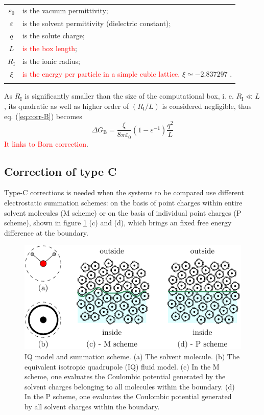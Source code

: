 \begin{tabular}{cl}
 $\varepsilon_{0}$ & is the vacuum permittivity;\tabularnewline
$\varepsilon$ & is the solvent permittivity (dielectric constant);\tabularnewline
$q$ & is the solute charge;\tabularnewline
$L$ & \textcolor{red}{is the box length};\tabularnewline
$R_{\mathrm{I}}$ & is the ionic radius;\tabularnewline
$\xi$ & \textcolor{red}{is the energy per particle in a simple cubic lattice,}
$\xi\simeq-2.837297$ \citep{nijboer}.\tabularnewline
 & \tabularnewline
\end{tabular} 

As $R_{\mathrm{I}}$ is significantly smaller than the size of the
computational box, i. e. $R_{\mathrm{I}}\ll L$, its quadratic as
well as higher order of $\left(R_{\mathrm{I}}/L\right)$ is considered
negligible, thus eq. (\ref{eq:corr-B}) becomes
\begin{equation}
\Delta G_{\mathrm{B}}=\frac{\xi}{8\pi\varepsilon_{0}}\left(1-\varepsilon^{-1}\right)\frac{q^{2}}{L}
\end{equation}
\textcolor{red}{It links to Born correction}.


\subsection{Correction of type C}

Type-C corrections is needed when the systems to be compared use different
electrostatic summation schemes: on the basis of point charges within
entire solvent molecules (M scheme) or on the basis of individual
point charges (P scheme), shown in figure \ref{fig:IQ-model-som-scheme}
(c) and (d), which brings an fixed free energy difference at the boundary.

\begin{figure}[h]
\begin{centering}
\includegraphics{_figure/ion_correction}
\par\end{centering}

\caption[IQ model and summation scheme]{IQ model and summation scheme. (a) The solvent molecule. (b) The
equivalent isotropic quadrupole (IQ) fluid model. (c) In the M scheme,
one evaluates the Coulombic potential generated by the solvent charges
belonging to all molecules within the boundary. (d) In the P scheme,
one evaluates the Coulombic potential generated by all solvent charges
within the boundary.\label{fig:IQ-model-som-scheme}}
\end{figure}


